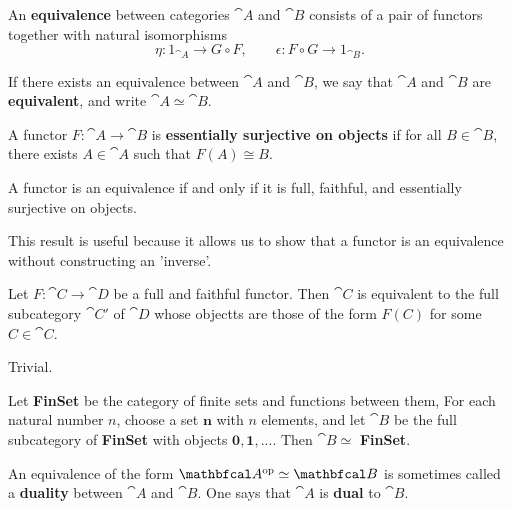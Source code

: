 \documentclass[11pt,a4paper]{article}
\begin{document}
\begin{definition}
    An \textbf{equivalence} between categories $\cat{A}$ and $\cat{B}$ consists of a pair of functors together with natural isomorphisms
    \begin{equation*}
        \eta: 1_{\cat{A}} \to G\circ F, \qquad \epsilon: F\circ G\to 1_{\cat{B}}.
    \end{equation*}
\end{definition}

If there exists an equivalence between $\cat{A}$ and $\cat{B}$, we say that $\cat{A}$ and $\cat{B}$ are \textbf{equivalent}, and write $\cat{A}\simeq\cat{B}$.

\begin{definition}
    A functor $F: \cat{A}\to \cat{B}$ is \textbf{essentially surjective on objects} if for all $B\in\cat{B}$, there exists $A\in\cat{A}$ such that $F(A)\cong B$.
\end{definition}

\begin{proposition}
    A functor is an equivalence if and only if it is full, faithful, and essentially surjective on objects.
\end{proposition}

This result is useful because it allows us to show that a functor is an equivalence without constructing an 'inverse'.

\begin{corollary}
    Let $F:\cat{C}\to\cat{D}$ be a full and faithful functor. Then $\cat{C}$ is equivalent to the full subcategory $\cat{C'}$ of $\cat{D}$ whose objectts are those of the form $F(C)$ for some $C\in\cat{C}$.
\end{corollary}
\proof Trivial.

\begin{example}
    Let \textbf{FinSet} be the category of finite sets and functions between them, For each natural number $n$, choose a set $\mathbf{n}$ with $n$ elements, and let $\cat{B}$ be the full subcategory of \textbf{FinSet} with objects $\mathbf{0, 1, ...}$. Then $\cat{B} \simeq$ \textbf{FinSet}.
\end{example}

\begin{example}
    An equivalence of the form $\catop{A} \simeq \cat{B}$ is sometimes called a \textbf{duality} between $\cat{A}$ and $\cat{B}$. One says that $\cat{A}$ is \textbf{dual} to $\cat{B}$.
\end{example}
\end{document}
